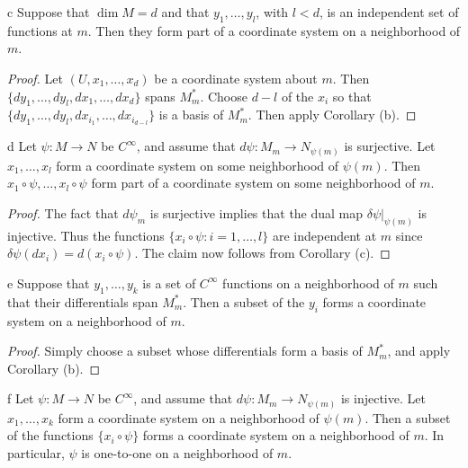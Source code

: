 \begin{corollary*}{c}
	Suppose that $\dim M = d$ and that $y_{1}, \ldots, y_{l}$, with $l < d$, is an independent set of functions at $m$. Then they form part of a coordinate system on a neighborhood of $m$.
\end{corollary*}

\begin{proof}
	Let $(U, x_1, \ldots, x_d)$ be a coordinate system about $m$. Then $\{dy_1, \ldots, dy_l, dx_1, \ldots, dx_d\}$ spans $M_m^*$. Choose $d-l$ of the $x_i$ so that $\{dy_1, \ldots, dy_l, dx_{i_1}, \ldots, dx_{i_{d-l}}\}$ is a basis of $M_m^*$. Then apply Corollary (b).
\end{proof}

\begin{corollary*}{d}
	Let $\psi\colon M \to N$ be $C^{\infty}$, and assume that $d\psi\colon M_{m} \to N_{\psi(m)}$ is surjective. Let $x_{1}, \ldots, x_{l}$ form a coordinate system on some neighborhood of $\psi(m)$. Then $x_{1} \circ \psi, \ldots, x_{l} \circ \psi$ form part of a coordinate system on some neighborhood of $m$.
\end{corollary*}

\begin{proof}
	The fact that $d\psi_{m}$ is surjective implies that the dual map $\delta\psi|_{\psi(m)}$ is injective. Thus the functions $\{x_{i}\circ\psi\colon i=1,\ldots,l\}$ are independent at $m$ since $\delta\psi(dx_{i})=d(x_{i}\circ\psi)$. The claim now follows from Corollary (c).
\end{proof}

\begin{corollary*}{e}
	Suppose that $y_{1},\ldots,y_{k}$ is a set of $C^{\infty}$ functions on a neighborhood of $m$ such that their differentials span $M_{m}^{*}$. Then a subset of the $y_{i}$ forms a coordinate system on a neighborhood of $m$.
\end{corollary*}

\begin{proof}
	Simply choose a subset whose differentials form a basis of $M_{m}^{*}$, and apply Corollary (b).
\end{proof}

\begin{corollary*}{f}
	Let $\psi\colon M \to N$ be $C^{\infty}$, and assume that $d\psi\colon M_{m} \to N_{\psi(m)}$ is injective. Let $x_{1}, \ldots, x_{k}$ form a coordinate system on a neighborhood of $\psi(m)$. Then a subset of the functions $\{x_{i} \circ \psi\}$ forms a coordinate system on a neighborhood of $m$. In particular, $\psi$ is one-to-one on a neighborhood of $m$.
\end{corollary*}

